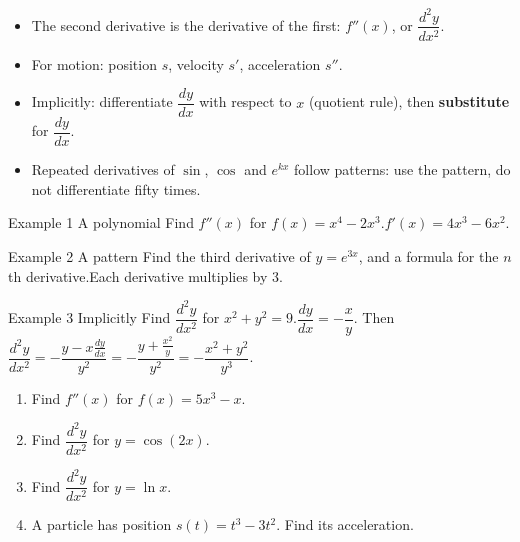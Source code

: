 \documentclass[11pt]{article}
\begin{document}

\begin{ideabox}
\begin{itemize}[leftmargin=*,itemsep=2pt,topsep=2pt]
  \item The second derivative is the derivative of the first: $f''(x)$, or $\dfrac{d^2y}{dx^2}$.
  \item For motion: position $s$, velocity $s'$, acceleration $s''$.
  \item Implicitly: differentiate $\dfrac{dy}{dx}$ with respect to $x$ (quotient rule), then \textbf{substitute} for $\dfrac{dy}{dx}$.
  \item Repeated derivatives of $\sin$, $\cos$ and $e^{kx}$ follow patterns: use the pattern, do not differentiate fifty times.
\end{itemize}
\end{ideabox}

\begin{example}{Example 1 \textperiodcentered{} A polynomial}
Find $f''(x)$ for $f(x)=x^4-2x^3$.\soln $f'(x)=4x^3-6x^2$.
\end{example}

\begin{example}{Example 2 \textperiodcentered{} A pattern}
Find the third derivative of $y=e^{3x}$, and a formula for the $n$th derivative.\soln Each derivative multiplies by 3.
\end{example}

\begin{example}{Example 3 \textperiodcentered{} Implicitly}
Find $\dfrac{d^2y}{dx^2}$ for $x^2+y^2=9$.\soln $\dfrac{dy}{dx}=-\dfrac xy$. Then $\dfrac{d^2y}{dx^2}=-\dfrac{y-x\frac{dy}{dx}}{y^2}=-\dfrac{y+\frac{x^2}{y}}{y^2}=-\dfrac{x^2+y^2}{y^3}$.
\end{example}

\newpage
{}

\begin{enumerate}[leftmargin=*,itemsep=2pt]
  \item Find $f''(x)$ for $f(x)=5x^3-x$.\work{2.3cm}
  \item Find $\dfrac{d^2y}{dx^2}$ for $y=\cos(2x)$.\work{2.3cm}
  \item Find $\dfrac{d^2y}{dx^2}$ for $y=\ln x$.\work{2.3cm}
  \item A particle has position $s(t)=t^3-3t^2$. Find its acceleration.\work{2.3cm}
\end{enumerate}
\end{document}

